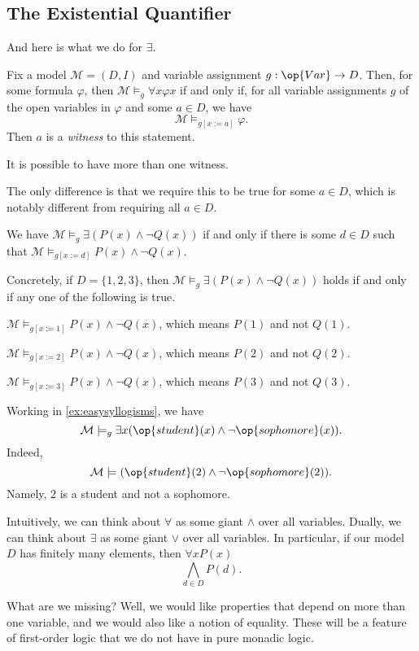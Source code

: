 \subsection{The Existential Quantifier}
And here is what we do for $\exists$.
\begin{definition}
	Fix a model $\mathcal M=(D,I)$ and variable assignment $g:\op{Var}\to D$. Then, for some formula $\varphi$, then $\mathcal M\models_g\forall x\varphi x$ if and only if, for all variable assignments $g$ of the open variables in $\varphi$ and some $a\in D$, we have
	\[\mathcal M\models_{g[x:=a]}\varphi.\]
	Then $a$ is a \textit{witness} to this statement.
\end{definition}
\begin{remark}
	It is possible to have more than one witness.
\end{remark}
The only difference is that we require this to be true for some $a\in D$, which is notably different from requiring all $a\in D$.
\begin{example}
	We have $\mathcal M\models_g\exists(P(x)\land\lnot Q(x))$ if and only if there is some $d\in D$ such that $\mathcal M\models_{g[x:=d]}P(x)\land\lnot Q(x)$.

	Concretely, if $D=\{1,2,3\}$, then $\mathcal M\models_g\exists(P(x)\land\lnot Q(x))$ holds if and only if any one of the following is true.
	\begin{listroman}
		\item $\mathcal M\models_{g[x:=1]}P(x)\land\lnot Q(x)$, which means $P(1)$ and not $Q(1)$.
		\item $\mathcal M\models_{g[x:=2]}P(x)\land\lnot Q(x)$, which means $P(2)$ and not $Q(2)$.
		\item $\mathcal M\models_{g[x:=3]}P(x)\land\lnot Q(x)$, which means $P(3)$ and not $Q(3)$.
	\end{listroman}
\end{example}
\begin{example}
	Working in \autoref{ex:easysyllogisms}, we have
	\[\mathcal M\models_g\exists x(\op{student}(x)\land\lnot\op{sophomore}(x)).\]
	Indeed,
	\[\mathcal M\models(\op{student}(2)\land\lnot\op{sophomore}(2)).\]
	Namely, $2$ is a student and not a sophomore.
\end{example}
\begin{remark}
	Intuitively, we can think about $\forall$ as some giant $\land$ over all variables. Dually, we can think about $\exists$ as some giant $\lor$ over all variables. In particular, if our model $D$ has finitely many elements, then $\forall xP(x)$
	\[\bigwedge_{d\in D}P(d).\]
\end{remark}
What are we missing? Well, we would like properties that depend on more than one variable, and we would also like a notion of equality. These will be a feature of first-order logic that we do not have in pure monadic logic.

